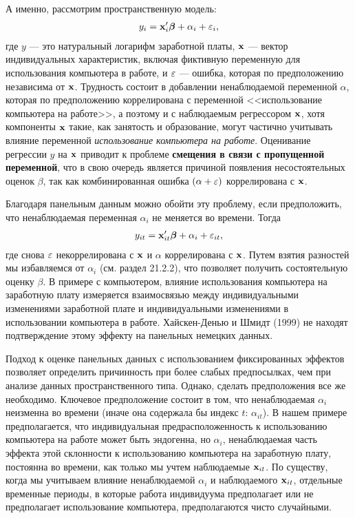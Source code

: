 А именно, рассмотрим пространственную модель:
\begin{align}
y_i=\mathbf{x}'_i \bm\beta+\alpha_i +\varepsilon_i,
\nonumber
\end{align}
где $y$ --- это натуральный логарифм заработной платы, $\mathbf{x}$ --- вектор индивидуальных характеристик, включая фиктивную переменную для использования компьютера в работе, и $\varepsilon$ --- ошибка, которая по предположению независима от $\mathbf{x}$. Трудность состоит в добавлении ненаблюдаемой переменной $\alpha$, которая по предположению коррелирована с переменной <<использование компьютера на работе>>, а поэтому и с наблюдаемым регрессором $\mathbf{x}$, хотя компоненты $\mathbf{x}$ такие, как занятость и образование, могут частично учитывать влияние переменной {\it использование компьютера на работе}. Оценивание регрессии $y$ на $\mathbf{x}$ приводит к проблеме \textbf{смещения в связи с пропущенной переменной}, что в свою очередь является причиной появления несостоятельных оценок $\beta$, так как комбинированная ошибка $(\alpha + \varepsilon)$ коррелирована с $\mathbf{x}$.

Благодаря панельным данным можно обойти эту проблему, если предположить, что ненаблюдаемая переменная $\alpha_i$ не меняется во времени. Тогда 
\begin{align}
y_{it}=\mathbf{x}'_{it} \bm\beta+\alpha_i +\varepsilon_{it},
\nonumber
\end{align}
где снова $\varepsilon$  некоррелирована с $\mathbf{x}$ и $\alpha$ коррелирована с $\mathbf{x}$. Путем взятия разностей мы избавляемся от $\alpha_i$ (см. раздел 21.2.2), что позволяет получить состоятельную оценку $\beta$. В примере с компьютером, влияние использования компьютера на заработную плату измеряется взаимосвязью между индивидуальными изменениями заработной плате и индивидуальными изменениями в использовании компьютера в работе. Хайскен-Денью и Шмидт (1999) не находят подтверждение этому эффекту на панельных немецких данных.

Подход к оценке панельных данных с использованием фиксированных эффектов позволяет определить причинность при более слабых предпосылках, чем при анализе данных пространственного типа. Однако, сделать предположения все же необходимо. Ключевое предположение состоит в том, что ненаблюдаемая $\alpha_i$ неизменна во времени (иначе она содержала бы индекс $t$: $\alpha_{it}$). В нашем примере предполагается, что индивидуальная предрасположенность к использованию компьютера на работе может быть эндогенна, но $\alpha_i$, ненаблюдаемая часть эффекта этой склонности к использованию компьютера  на заработную плату, постоянна во времени, как только мы учтем наблюдаемые  $\mathbf{x}_{it}$. По существу, когда мы учитываем влияние ненаблюдаемой $\alpha_i$ и наблюдаемого $\mathbf{x}_{it}$, отдельные временные периоды, в которые работа индивидуума предполагает или не предполагает использование компьютера, предполагаются чисто случайными.

